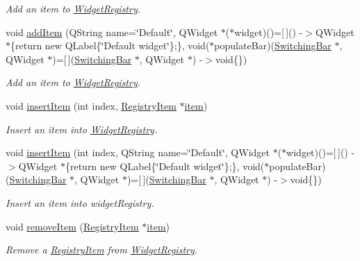 \begin{DoxyCompactItemize}
\begin{DoxyCompactList}\small\item\em Add an item to \hyperlink{class_widget_registry}{Widget\+Registry}. \end{DoxyCompactList}\item 
void \hyperlink{class_widget_registry_aa8f64ed60af596fedc3841129bfdb7cc}{add\+Item} (Q\+String name=\char`\"{}Default\char`\"{}, Q\+Widget $\ast$($\ast$widget)()=\mbox{[}$\,$\mbox{]}() -\/$>$Q\+Widget $\ast$\{return new Q\+Label\{\char`\"{}Default widget\char`\"{}\};\}, void($\ast$populate\+Bar)(\hyperlink{class_switching_bar}{Switching\+Bar} $\ast$, Q\+Widget $\ast$)=\mbox{[}$\,$\mbox{]}(\hyperlink{class_switching_bar}{Switching\+Bar} $\ast$, Q\+Widget $\ast$) -\/$>$void\{\})
\begin{DoxyCompactList}\small\item\em Add an item to \hyperlink{class_widget_registry}{Widget\+Registry}. \end{DoxyCompactList}\item 
void \hyperlink{class_widget_registry_a3a323a51d1e65d61d6ed9b8639a21070}{insert\+Item} (int index, \hyperlink{class_registry_item}{Registry\+Item} $\ast$\hyperlink{class_widget_registry_acc992d9f1f43b631bde87450b0c25b80}{item})
\begin{DoxyCompactList}\small\item\em Insert an item into \hyperlink{class_widget_registry}{Widget\+Registry}. \end{DoxyCompactList}\item 
void \hyperlink{class_widget_registry_a2e2effc3109c57494dafd5e0f59d0ed2}{insert\+Item} (int index, Q\+String name=\char`\"{}Default\char`\"{}, Q\+Widget $\ast$($\ast$widget)()=\mbox{[}$\,$\mbox{]}() -\/$>$Q\+Widget $\ast$\{return new Q\+Label\{\char`\"{}Default widget\char`\"{}\};\}, void($\ast$populate\+Bar)(\hyperlink{class_switching_bar}{Switching\+Bar} $\ast$, Q\+Widget $\ast$)=\mbox{[}$\,$\mbox{]}(\hyperlink{class_switching_bar}{Switching\+Bar} $\ast$, Q\+Widget $\ast$) -\/$>$void\{\})
\begin{DoxyCompactList}\small\item\em Insert an item into widget\+Registry. \end{DoxyCompactList}\item 
void \hyperlink{class_widget_registry_a076561002958c840a9096d27cdbfdeed}{remove\+Item} (\hyperlink{class_registry_item}{Registry\+Item} $\ast$\hyperlink{class_widget_registry_acc992d9f1f43b631bde87450b0c25b80}{item})
\begin{DoxyCompactList}\small\item\em Remove a \hyperlink{class_registry_item}{Registry\+Item} from \hyperlink{class_widget_registry}{Widget\+Registry}. \end{DoxyCompactList}\item 

\end{DoxyCompactItemize}
